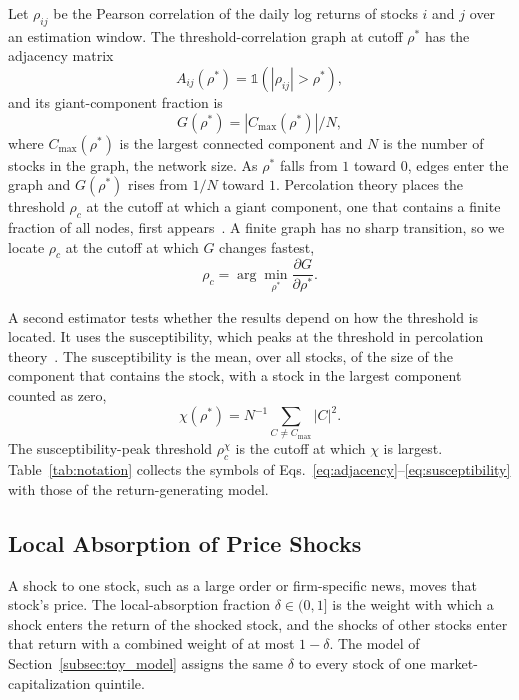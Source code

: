 \documentclass[a4paper,fleqn]{cas-sc}
\begin{document}
Let $\rho_{ij}$ be the Pearson correlation of the daily log returns of stocks $i$ and $j$ over an estimation window. The threshold-correlation graph at cutoff $\rho^*$ has the adjacency matrix
\begin{equation}\label{eq:adjacency}
  A_{ij}(\rho^*) = \mathbb{1}\!\left(|\rho_{ij}| > \rho^*\right),
\end{equation}
and its giant-component fraction is
\begin{equation}\label{eq:giant_component}
  G(\rho^*) = |C_{\max}(\rho^*)|/N,
\end{equation}
where $C_{\max}(\rho^*)$ is the largest connected component and $N$ is the number of stocks in the graph, the network size. As $\rho^*$ falls from $1$ toward $0$, edges enter the graph and $G(\rho^*)$ rises from $1/N$ toward $1$. Percolation theory places the threshold $\rho_c$ at the cutoff at which a giant component, one that contains a finite fraction of all nodes, first appears~\citep{stauffer1994introduction}. A finite graph has no sharp transition, so we locate $\rho_c$ at the cutoff at which $G$ changes fastest,
\begin{equation}\label{eq:percolation_threshold}
  \rho_c = \arg\min_{\rho^*} \frac{\partial G}{\partial \rho^*}.
\end{equation}

A second estimator tests whether the results depend on how the threshold is located. It uses the susceptibility, which peaks at the threshold in percolation theory~\citep{stauffer1994introduction}. The susceptibility is the mean, over all stocks, of the size of the component that contains the stock, with a stock in the largest component counted as zero,
\begin{equation}\label{eq:susceptibility}
  \chi(\rho^*) = N^{-1}\sum_{C \neq C_{\max}} |C|^2.
\end{equation}
The susceptibility-peak threshold $\rho_c^{\chi}$ is the cutoff at which $\chi$ is largest. Table~\ref{tab:notation} collects the symbols of Eqs.~\eqref{eq:adjacency}--\eqref{eq:susceptibility} with those of the return-generating model.

\subsection{Local Absorption of Price Shocks}\label{subsec:dissipation_framework}

A shock to one stock, such as a large order or firm-specific news, moves that stock's price. The local-absorption fraction $\delta \in (0, 1]$ is the weight with which a shock enters the return of the shocked stock, and the shocks of other stocks enter that return with a combined weight of at most $1 - \delta$. The model of Section~\ref{subsec:toy_model} assigns the same $\delta$ to every stock of one market-capitalization quintile.
\end{document}
